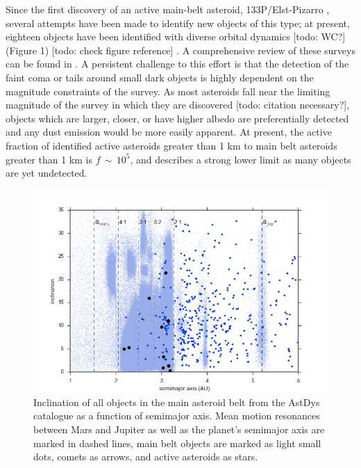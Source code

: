 \documentclass[iop,apj]{emulateapj}
\begin{document}
Since the first discovery of an active main-belt asteroid, 133P/Elst-Pizarro \citep{elst96}, several attempts have been made to identify new objects of this type; at present, eighteen objects have been identified with diverse orbital dynamics [todo: WC?] (Figure 1) [todo: check figure reference] \citep{jewitt15}. A comprehensive review of these surveys can be found in \citet{hsieh15}.  A persistent challenge to this effort is that the detection of the faint coma or tails around small dark objects is highly dependent on the magnitude constraints of the survey. As most asteroids fall near the limiting magnitude of the survey in which they are discovered [todo: citation necessary?], objects which are larger, closer, or have higher albedo are preferentially detected and any dust emission would be more easily apparent. At present, the active fraction of identified active asteroids greater than 1 km to main belt asteroids greater than 1 km is $f \, \sim \, 10^5$, and describes a strong lower limit as many objects are yet undetected. \citep{jewitt15} %

\begin{figure}[!htb]
    \centering
    \includegraphics[width=\linewidth]{graphs/aa_comets_mba_all.png}
    \caption{Inclination of all objects in the main asteroid belt from the AstDys catalogue as a function of semimajor axis.  Mean motion resonances between Mars and Jupiter as well as the planet's semimajor axis are marked in dashed lines, main belt objects are marked as light small dots, comets as arrows, and active asteroids as stars.}\label{fig:1}
\end{figure}
\end{document}
